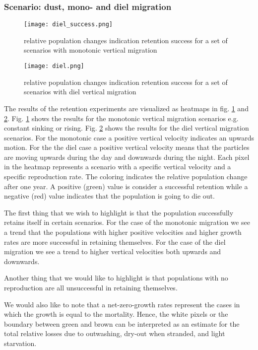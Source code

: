 \subsubsection*{Scenario: dust, mono- and diel migration}

\begin{figure}
    \texttt{[image: diel\_success.png]}
    \caption[]{relative population changes indication retention success for a set of scenarios with monotonic vertical migration}
    \label{fig:monotonic_retention_success}
\end{figure}
\begin{figure}
    \texttt{[image: diel.png]}
    \caption[]{relative population changes indication retention success for a set of scenarios with diel vertical migration}
    \label{fig:diel_retention_success}
\end{figure}

The results of the retention experiments are visualized as heatmaps in fig. \ref{fig:monotonic_retention_success} and \ref{fig:diel_retention_success}.
Fig. \ref{fig:monotonic_retention_success} shows the results for the monotonic vertical migration scenarios e.g. constant sinking or rising.
Fig. \ref{fig:diel_retention_success} shows the results for the diel vertical migration scenarios. For the monotonic case a positive vertical velocity indicates an upwards motion. For the the diel case a positive vertical velocity means that the particles are moving upwards during the day and downwards during the night.
Each pixel in the heatmap represents a scenario with a specific vertical velocity and a specific reproduction rate. The coloring indicates the relative population change after one year. A positive (green) value is consider a successful retention while a negative (red) value indicates that the population is going to die out.

The first thing that we wish to highlight is that the population successfully retains itself in certain scenarios. For the case of the monotonic migration we see a trend that the populations with higher positive velocities and higher growth rates are more successful in retaining themselves.
For the case of the diel migration we see a trend to higher vertical velocities both upwards and downwards.

Another thing that we would like to highlight is that populations with no reproduction are all unsuccessful in retaining themselves.

We would also like to note that a net-zero-growth rates represent the cases in which the growth is equal to the mortality.
Hence, the white pixels or the boundary between green and brown can be interpreted as an estimate for the total relative losses due to outwashing, dry-out when stranded, and light starvation.

